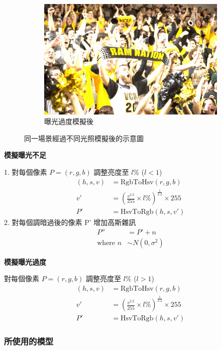 \begin{figure}[htb]
\begin{subfigure}[b]{0.3\textwidth}
    \centering
    \includegraphics[width=\textwidth]{figures/same_bright}
    \caption{曝光過度模擬後}
\end{subfigure}
\caption[不同光照模擬下的同一場景]{同一場景經過不同光照模擬後的示意圖}
\label{fig:same_triple}
\end{figure}

\textbf{模擬曝光不足}

1. 對每個像素 $P = (r, g, b)$ 調整亮度至 $l\%$ ($l < 1$)
\begin{align*}
(h, s, v) &= \text{RgbToHsv}(r, g, b) \\
v' &= (\frac{v^{2.2}}{255} \times l\%)^{\frac{1}{2.2}} \times 255 \\
P' &= \text{HsvToRgb}(h, s, v')
\end{align*}
2. 對每個調暗過後的像素 P' 增加高斯雜訊
\begin{align*}
P'' &= P' + n\\
\text{where } n &\sim N(0, \sigma^2)
\end{align*}

\textbf{模擬曝光過度}

對每個像素 $P = (r, g, b)$ 調整亮度至 $l\%$ ($l > 1$)
\begin{align*}
(h, s, v) &= \text{RgbToHsv}(r, g, b) \\
v' &= (\frac{v^{2.2}}{255} \times l\%)^{\frac{1}{2.2}} \times 255 \\
P' &= \text{HsvToRgb}(h, s, v')
\end{align*}

\subsubsection{所使用的模型}

